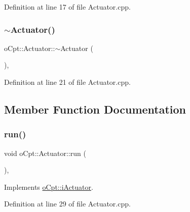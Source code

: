 Definition at line 17 of file Actuator.\+cpp.

\hypertarget{classo_cpt_1_1_actuator_a1934864651148186d4e9728560ede248}{}\label{classo_cpt_1_1_actuator_a1934864651148186d4e9728560ede248} 
\subsubsection{\texorpdfstring{$\sim$\+Actuator()}{~Actuator()}}
{\footnotesize\ttfamily o\+Cpt\+::\+Actuator\+::$\sim$\+Actuator (\begin{DoxyParamCaption}{ }\end{DoxyParamCaption})\hspace{0.3cm}{\ttfamily [override]}, {\ttfamily [virtual]}}



Definition at line 21 of file Actuator.\+cpp.



\subsection{Member Function Documentation}
\hypertarget{classo_cpt_1_1_actuator_a8985818fcfb644acce17ce50c5c7f86b}{}\label{classo_cpt_1_1_actuator_a8985818fcfb644acce17ce50c5c7f86b} 
\subsubsection{\texorpdfstring{run()}{run()}}
{\footnotesize\ttfamily void o\+Cpt\+::\+Actuator\+::run (\begin{DoxyParamCaption}{ }\end{DoxyParamCaption})\hspace{0.3cm}{\ttfamily [override]}, {\ttfamily [virtual]}}



Implements \hyperlink{classo_cpt_1_1i_actuator_abf4db1f9f6b59bdefc86ca44aed0f49a}{o\+Cpt\+::i\+Actuator}.



Definition at line 29 of file Actuator.\+cpp.

\hypertarget{classo_cpt_1_1_actuator_a3a3813e5730f0257e74de7300eeeffa1}{}\label{classo_cpt_1_1_actuator_a3a3813e5730f0257e74de7300eeeffa1} 
